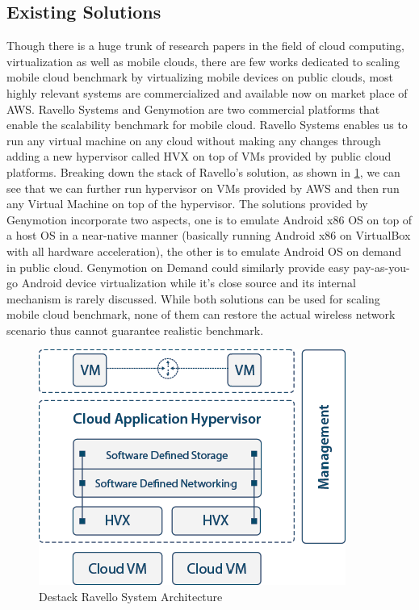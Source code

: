 \documentclass[journal,comsoc]{IEEEtran}
\begin{document}
\subsection{Existing Solutions}
Though there is a huge trunk of research papers in the field of cloud computing, virtualization as well as mobile clouds, there are few works dedicated to scaling mobile cloud benchmark by virtualizing mobile devices on public clouds, most highly relevant systems are commercialized and available now on market place of AWS. Ravello Systems and Genymotion are two commercial platforms that enable the scalability benchmark for mobile cloud. Ravello Systems enables us to run any virtual machine on any cloud without making any changes through adding a new hypervisor called HVX on top of VMs provided by public cloud platforms. Breaking down the stack of Ravello's solution, as shown in \ref{hvx_diagram}, we can see that we can further run hypervisor on VMs provided by AWS and then run any Virtual Machine on top of the hypervisor. The solutions provided by Genymotion incorporate two aspects, one is to emulate Android x86 OS on top of a host OS in a near-native manner (basically running Android x86 on VirtualBox with all hardware acceleration), the other is to emulate Android OS on demand in public cloud. Genymotion on Demand could similarly provide easy pay-as-you-go Android device virtualization while it's close source and its internal mechanism is rarely discussed. While both solutions can be used for scaling mobile cloud benchmark, none of them can restore the actual wireless network scenario thus cannot guarantee realistic benchmark.
\begin{figure}[htbp]
\begin{center}
\includegraphics[width=0.8\linewidth]{hvx_diagram.png} 
\end{center}	   
\caption{Destack Ravello System Architecture}\label{hvx_diagram}
\end{figure}
\end{document}
